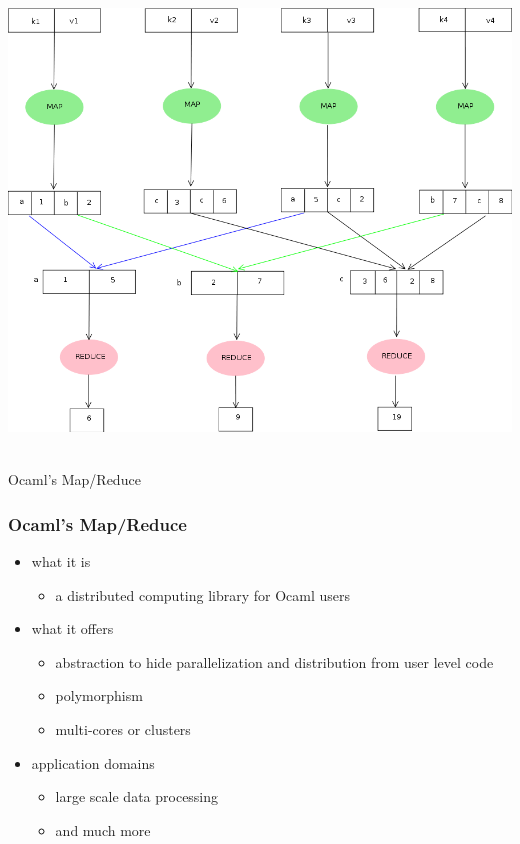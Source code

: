\documentclass{beamer}
\let\emph\alert
\begin{document}
\begin{frame}\frametitle{}
  \begin{center}
    \includegraphics[width=\textwidth]{mr-new}
  \end{center}
\end{frame}

\begin{frame}
  \begin{center}
    \hrulefill\\
    \emph{Ocaml's Map/Reduce}
  \end{center}
\end{frame}

\begin{frame}\frametitle{Ocaml's Map/Reduce}
  \begin{itemize}
  \item 
    what it is
    \begin{itemize}
    \item a distributed computing library for Ocaml users
    \end{itemize}

    \bigskip
  \item 
    what it offers
    \begin{itemize}
    \item abstraction to hide parallelization and distribution from
      user level code
    \item \emph{polymorphism}
    \item \emph{multi-cores or clusters}
    \end{itemize}

    \bigskip
  \item 
    application domains
    \begin{itemize}
    \item large scale data processing
    \item \emph{and much more}
    \end{itemize}
  \end{itemize}
\end{frame}
\end{document}
